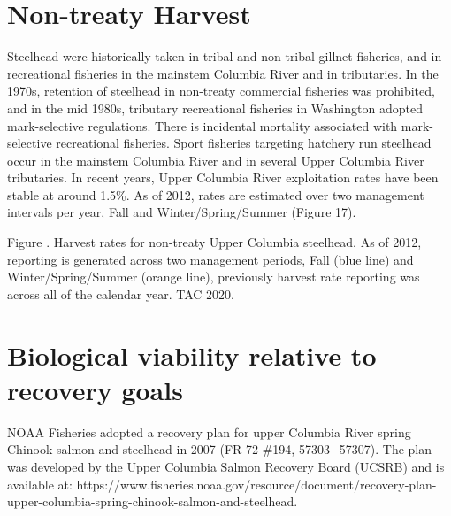 \documentclass[
  letterpaper,
  oneside,
  open=any]{scrbook}
\begin{document}
\hypertarget{non-treaty-harvest}{%
\section{Non-treaty Harvest}\label{non-treaty-harvest}}

Steelhead were historically taken in tribal and non-tribal gillnet
fisheries, and in recreational fisheries in the mainstem Columbia River
and in tributaries. In the 1970s, retention of steelhead in non-treaty
commercial fisheries was prohibited, and in the mid 1980s, tributary
recreational fisheries in Washington adopted mark-selective regulations.
There is incidental mortality associated with mark-selective
recreational fisheries. Sport fisheries targeting hatchery run steelhead
occur in the mainstem Columbia River and in several Upper Columbia River
tributaries. In recent years, Upper Columbia River exploitation rates
have been stable at around 1.5\%. As of 2012, rates are estimated over
two management intervals per year, Fall and Winter/Spring/Summer (Figure
17).

Figure . Harvest rates for non-treaty Upper Columbia steelhead. As of
2012, reporting is generated across two management periods, Fall (blue
line) and Winter/Spring/Summer (orange line), previously harvest rate
reporting was across all of the calendar year. TAC 2020.

\hypertarget{biological-viability-relative-to-recovery-goals}{%
\section{Biological viability relative to recovery
goals}\label{biological-viability-relative-to-recovery-goals}}

NOAA Fisheries adopted a recovery plan for upper Columbia River spring
Chinook salmon and steelhead in 2007 (FR 72 \#194, 57303−57307). The
plan was developed by the Upper Columbia Salmon Recovery Board (UCSRB)
and is available at:
https://www.fisheries.noaa.gov/resource/document/recovery-plan-upper-columbia-spring-chinook-salmon-and-steelhead.
\end{document}
